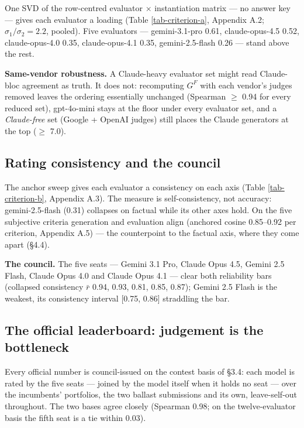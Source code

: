 \documentclass{article}
\begin{document}
One SVD of the row-centred evaluator \ensuremath{\times} instantiation matrix --- no answer key --- gives each evaluator a loading (Table \ref{tab-criterion-a}, Appendix A.2; \(\sigma_1/\sigma_2 = 2.2\), pooled). Five evaluators --- gemini-3.1-pro 0.61, claude-opus-4.5 0.52, claude-opus-4.0 0.35, claude-opus-4.1 0.35, gemini-2.5-flash 0.26 --- stand above the rest.

\textbf{Same-vendor robustness.} A Claude-heavy evaluator set might read Claude-bloc agreement as truth. It does not: recomputing \(G^{F}\) with each vendor's judges removed leaves the ordering essentially unchanged (Spearman \ensuremath{\ge} 0.94 for every reduced set), gpt-4o-mini stays at the floor under every evaluator set, and a \emph{Claude-free} set (Google + OpenAI judges) still places the Claude generators at the top (\ensuremath{\ge} 7.0).

\subsection{Rating consistency and the council}\label{rating-consistency-and-the-council}

The anchor sweep gives each evaluator a consistency on each axis (Table \ref{tab-criterion-b}, Appendix A.3). The measure is self-consistency, not accuracy: gemini-2.5-flash (0.31) collapses on factual while its other axes hold. On the five subjective criteria generation and evaluation align (anchored cosine 0.85--0.92 per criterion, Appendix A.5) --- the counterpoint to the factual axis, where they come apart (\S{}4.4).

\textbf{The council.} The five seats --- Gemini 3.1 Pro, Claude Opus 4.5, Gemini 2.5 Flash, Claude Opus 4.0 and Claude Opus 4.1 --- clear both reliability bars (collapsed consistency \(\bar r\) 0.94, 0.93, 0.81, 0.85, 0.87); Gemini 2.5 Flash is the weakest, its consistency interval {[}0.75, 0.86{]} straddling the bar.

\subsection{The official leaderboard: judgement is the bottleneck}\label{the-official-leaderboard-judgement-is-the-bottleneck}

Every official number is council-issued on the contest basis of \S{}3.4: each model is rated by the five seats --- joined by the model itself when it holds no seat --- over the incumbents' portfolios, the two ballast submissions and its own, leave-self-out throughout. The two bases agree closely (Spearman 0.98; on the twelve-evaluator basis the fifth seat is a tie within 0.03).
\end{document}
